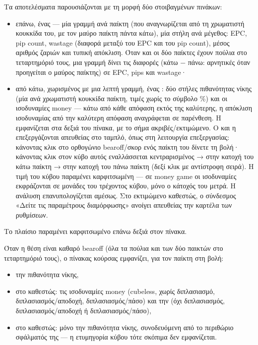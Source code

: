 \documentclass[letterpaper,10pt,greek]{sphinxmanual}
\begin{document}
\sphinxAtStartPar
Τα αποτελέσματα παρουσιάζονται με τη μορφή δύο στοιβαγμένων πινάκων:
\begin{itemize}
\item {} 
\sphinxAtStartPar
επάνω, ένας  — μία γραμμή ανά παίκτη (που αναγνωρίζεται από τη χρωματιστή κουκκίδα του, με τον μαύρο παίκτη πάντα κάτω), μία στήλη ανά μέγεθος: EPC, pip count, wastage (διαφορά μεταξύ του EPC και του pip count), μέσος αριθμός ζαριών και τυπική απόκλιση. Όταν και οι δύο παίκτες έχουν πούλια στο τεταρτημόριό τους, μια γραμμή  δίνει τις  διαφορές (κάτω − πάνω: αρνητικές όταν προηγείται ο μαύρος παίκτης) σε EPC, pips και wastage·

\item {} 
\sphinxAtStartPar
από κάτω, χωρισμένος με μια λεπτή γραμμή, ένας : δύο στήλες πιθανότητας νίκης (μία ανά χρωματιστή κουκκίδα παίκτη, τιμές χωρίς το σύμβολο \%) και οι ισοδυναμίες money — κάτω από κάθε απόφαση εκτός της καλύτερης, η απόκλιση ισοδυναμίας από την καλύτερη απόφαση αναγράφεται σε παρένθεση. Η  εμφανίζεται στα δεξιά του πίνακα, με το σήμα ακριβές/εκτιμώμενο. Ο  και η  επεξεργάζονται απευθείας στο ταμπλό, όπως στη λειτουργία επεξεργασίας: κάνοντας κλικ στο ορθογώνιο bearoff/σκορ ενός παίκτη του δίνετε τη βολή· κάνοντας κλικ στον κύβο αυτός εναλλάσσεται κεντραρισμένος → στην κατοχή του κάτω παίκτη → στην κατοχή του πάνω παίκτη (δεξί κλικ με αντίστροφη σειρά). Η τιμή του κύβου παραμένει καρφιτσωμένη — σε money game οι ισοδυναμίες εκφράζονται σε μονάδες του τρέχοντος κύβου, μόνο ο κάτοχός του μετρά. Η ανάλυση επανυπολογίζεται αμέσως. Στο εκτιμώμενο καθεστώς, ο σύνδεσμος «Δείτε τις παραμέτρους διαμόρφωσης» ανοίγει απευθείας την καρτέλα  των ρυθμίσεων.

\end{itemize}

\sphinxAtStartPar
Το πλαίσιο  παραμένει καρφιτσωμένο επάνω δεξιά στον πίνακα.

\sphinxAtStartPar
Όταν η θέση είναι καθαρό bearoff (όλα τα πούλια και των δύο παικτών στο τεταρτημόριό τους), ο πίνακας κούρσας εμφανίζει, για τον παίκτη στη βολή:
\begin{itemize}
\item {} 
\sphinxAtStartPar
την πιθανότητα νίκης,

\item {} 
\sphinxAtStartPar
στο  καθεστώς: τις ισοδυναμίες money (cubeless, χωρίς διπλασιασμό, διπλασιασμός/αποδοχή, διπλασιασμός/πάσο) και την  (όχι διπλασιασμός, διπλασιασμός/αποδοχή ή διπλασιασμός/πάσο),

\item {} 
\sphinxAtStartPar
στο  καθεστώς: μόνο την πιθανότητα νίκης, συνοδευόμενη από το περιθώριο σφάλματός της — η ετυμηγορία κύβου τότε σκόπιμα δεν εμφανίζεται.

\end{itemize}
\end{document}
